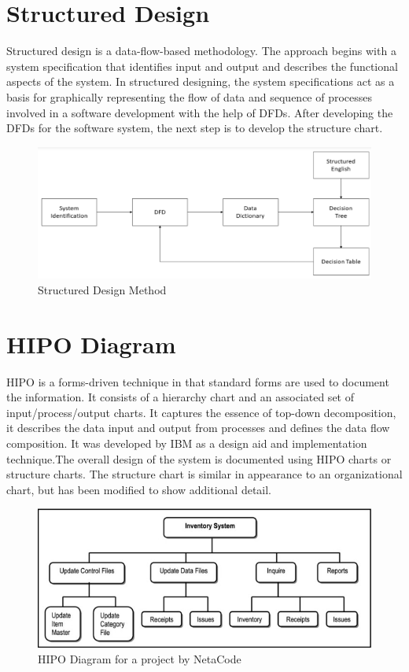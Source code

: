 \documentclass[a4paper,12pt]{report}
\begin{document}
\section{Structured Design}

Structured design is a data-flow-based methodology. The approach begins with a system specification that identifies input and output and describes the functional aspects of the system.  In structured designing, the system specifications act as a basis for graphically representing the flow of data and sequence of processes involved in a software development with the help of DFDs. After developing the DFDs for the software system, the next step is to develop the structure chart.


\begin{figure}[h]
	\centering
	\includegraphics[width=0.7\linewidth]{9_2}
	\caption{Structured Design Method}
	\label{fig:92}
\end{figure}
\section{HIPO Diagram}
HIPO is a forms-driven technique in that standard forms are used to document the information. It consists of a hierarchy chart and an associated set of input/process/output charts. It captures the essence of top-down decomposition, it describes the data input and output from processes and defines the data flow composition. It was developed by IBM as a design aid and implementation technique.The overall design of the system is documented using HIPO charts or structure charts. The structure chart is similar in appearance to an organizational chart, but has been modified to show additional detail.
\begin{figure}
	\centering
	\includegraphics[width=0.7\linewidth]{9_3}
	\caption{HIPO Diagram for a project by NetaCode}
	\label{fig:93}
\end{figure}
\end{document}
